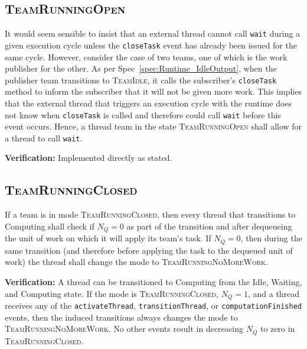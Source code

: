 \documentclass{article}
\newcommand{\TeamIdle}          {\textsc{TeamIdle}}
\newcommand{\TeamRunningOpen}   {\textsc{TeamRunningOpen}}
\newcommand{\TeamRunningClosed} {\textsc{TeamRunningClosed}}
\newcommand{\TeamRunningNoMoreWork} {\textsc{TeamRunningNoMoreWork}}
\begin{document}
\subsection{\TeamRunningOpen}
\begin{spec}
It  would seem sensible to insist that an external thread cannot call
\texttt{wait} during a given execution cycle unless the \texttt{closeTask} event
has already been issued for the same cycle.  However, consider the case of two
teams, one of which is the work publisher for the other.  As per
Spec~\ref{spec:Runtime_IdleOutput}, when the publisher team transitions to
{\TeamIdle}, it calls the subscriber's \texttt{closeTask} method to inform the
subscriber that it will not be given more work.  This implies that the external
thread that triggers an execution cycle with the runtime does not know when
\texttt{closeTask} is called and therefore could call \texttt{wait} before this
event occurs.  Hence, a thread team in the state {\TeamRunningOpen} shall allow
for a thread to call \texttt{wait}.
\end{spec}
\textbf{Verification:}\hspace{0.125in}  Implemented directly as stated.

\subsection{\TeamRunningClosed}
\begin{spec}
\label{spec:Closed_Transition}
If a team is in mode \TeamRunningClosed, then every thread that transitions to
Computing shall check if $N_Q = 0$ as part of the transition and after
dequeueing the unit of work on which it will apply its team's task.  If $N_Q =
0$, then during the same transition (and therefore before applying the task to
the dequeued unit of work) the thread shall change the mode to
\TeamRunningNoMoreWork.
\end{spec}
\textbf{Verification:}\hspace{0.125in}  A thread can be transitioned to
Computing from the Idle, Waiting, and Computing state.  If the mode is
{\TeamRunningClosed}, $N_Q = 1$, and a
thread receives any of the \texttt{activateThread}, \texttt{transitionThread},
or \texttt{computationFinished} events, then the induced transitions always changes
the mode to \TeamRunningNoMoreWork.  No other events result in decreasing $N_Q$
to zero in \TeamRunningClosed.
\end{document}
